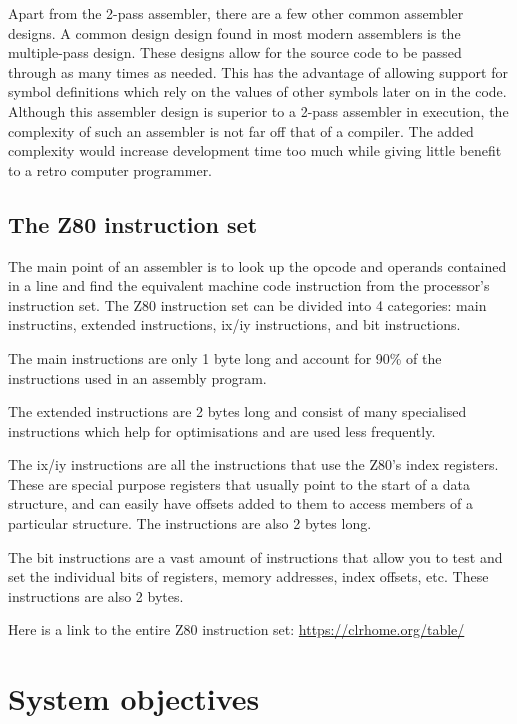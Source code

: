 \documentclass[a4paper]{report}
\begin{document}
Apart from the 2-pass assembler, there are a few other common assembler designs.
A common design design found in most modern assemblers is the multiple-pass
design. These designs allow for the source code to be passed through as many
times as needed. This has the advantage of allowing support for symbol
definitions which rely on the values of other symbols later on in the code.
Although this assembler design is superior to a 2-pass assembler in execution,
the complexity of such an assembler is not far off that of a compiler. The added
complexity would increase development time too much while giving little benefit
to a retro computer programmer.

\subsection{The Z80 instruction set}

The main point of an assembler is to look up the opcode and operands contained
in a line and find the equivalent machine code instruction from the processor's
instruction set. The Z80 instruction set can be divided into 4 categories: main
instructins, extended instructions, ix/iy instructions, and bit instructions.

The main instructions are only 1 byte long and account for 90\% of the
instructions used in an assembly program.

The extended instructions are 2 bytes long and consist of many specialised
instructions which help for optimisations and are used less frequently.

The ix/iy instructions are all the instructions that use the Z80's index
registers. These are special purpose registers that usually point to the start
of a data structure, and can easily have offsets added to them to access members
of a particular structure. The instructions are also 2 bytes long.

The bit instructions are a vast amount of instructions that allow you to test
and set the individual bits of registers, memory addresses, index offsets, etc.
These instructions are also 2 bytes.

Here is a link to the entire Z80 instruction set:
\url{https://clrhome.org/table/}


\section{System objectives}
\end{document}

